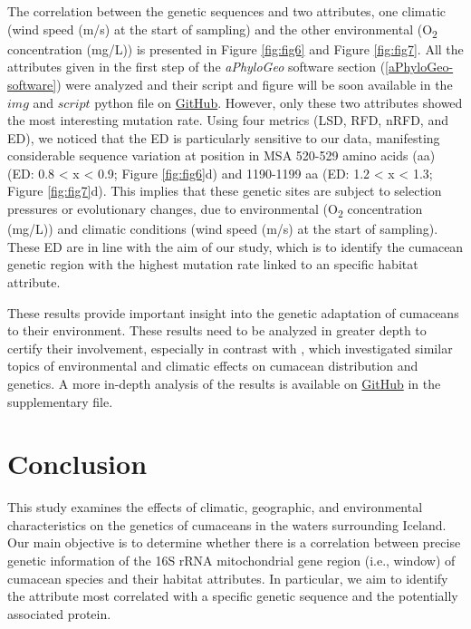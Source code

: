 The correlation between the genetic sequences and two attributes, one climatic (wind speed (m/s) at the start of sampling) and the other environmental (O\textsubscript{2} concentration (mg/L)) is presented in Figure \ref{fig:fig6} and Figure \ref{fig:fig7}. All the attributes given in the first step of the \textit{aPhyloGeo} software section (\autoref{aPhyloGeo-software}) were analyzed and their script and figure will be soon available in the $img$ and $script$ python file on \href{https://github.com/tahiri-lab/Cumacea_aPhyloGeo}{GitHub}. However, only these two attributes showed the most interesting mutation rate. Using four metrics (LSD, RFD, nRFD, and ED), we noticed that the ED is particularly sensitive to our data, manifesting considerable sequence variation at position in MSA 520-529 amino acids (aa) (ED: 0.8 < x < 0.9; Figure \ref{fig:fig6}d) and 1190-1199 aa (ED: 1.2 < x < 1.3; Figure \ref{fig:fig7}d). This implies that these genetic sites are subject to selection pressures or evolutionary changes, due to environmental (O\textsubscript{2} concentration (mg/L)) and climatic conditions (wind speed (m/s) at the start of sampling). These ED are in line with the aim of our study, which is to identify the cumacean genetic region with the highest mutation rate linked to an specific habitat attribute.

These results provide important insight into the genetic adaptation of cumaceans to their environment. These results need to be analyzed in greater depth to certify their involvement, especially in contrast with \citep{uhlir_adding_2021}, which investigated similar topics of environmental and climatic effects on cumacean distribution and genetics. A more in-depth analysis of the results is available on \href{https://github.com/tahiri-lab/Cumacea_aPhyloGeo}{GitHub} in the supplementary file.

\section{Conclusion}\label{conclusion}
This study examines the effects of climatic, geographic, and environmental characteristics on the genetics of cumaceans in the waters surrounding Iceland. Our main objective is to determine whether there is a  correlation between precise genetic information of the 16S rRNA mitochondrial gene region (i.e., window) of cumacean species and their habitat attributes. In particular, we aim to identify the attribute most correlated with a specific genetic sequence and the potentially associated protein.

